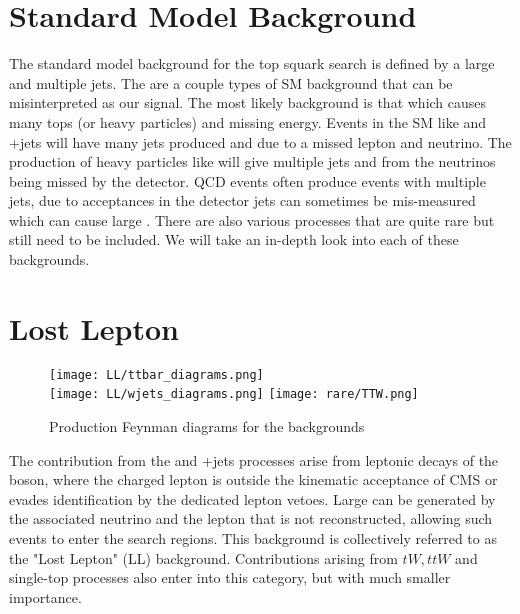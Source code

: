 \section{Standard Model Background}
\label{sec:SMBackground}

The standard model background for the top squark search is defined by a large \met{} and multiple jets. The are a couple types of SM background that can be misinterpreted as our signal. The most likely background is that which causes many tops (or heavy particles) and missing energy. Events in the SM like \ttbar{} and \W+jets will have many jets produced and \met{} due to a missed lepton and neutrino. The production of heavy particles like \Znunu{} will give multiple jets and \met{} from the neutrinos being missed by the detector. QCD events often produce events with multiple jets, due to acceptances in the detector jets can sometimes be mis-measured which can cause large \met{}. There are also various processes that are quite rare but still need to be included. We will take an in-depth look into each of these backgrounds. 

\section{Lost Lepton}
\label{sec:LL}

\begin{figure}
	\begin{center}
  \texttt{[image: LL/ttbar\_diagrams.png]}\\
  \texttt{[image: LL/wjets\_diagrams.png]}
  \texttt{[image: rare/TTW.png]} \\

	\caption[\ttbar{} Production]{Production Feynman diagrams for the \ttbar{} backgrounds \cite{fiedler_precision_nodate} }
	\label{fig:llb-ttbar-diagram}
	\end{center}
\end{figure}

The contribution from the \ttbar{} and \W+jets processes arise from leptonic decays of the \W{} boson, where the charged lepton is outside the kinematic acceptance of CMS or evades identification by the dedicated lepton vetoes. Large \met{} can be generated by the associated neutrino and the lepton that is not reconstructed, allowing such events to enter the search regions. This background is collectively referred to as the "Lost Lepton" (LL) background. Contributions arising from $tW, ttW$ and single-top processes also enter into this category, but with much smaller importance. 

